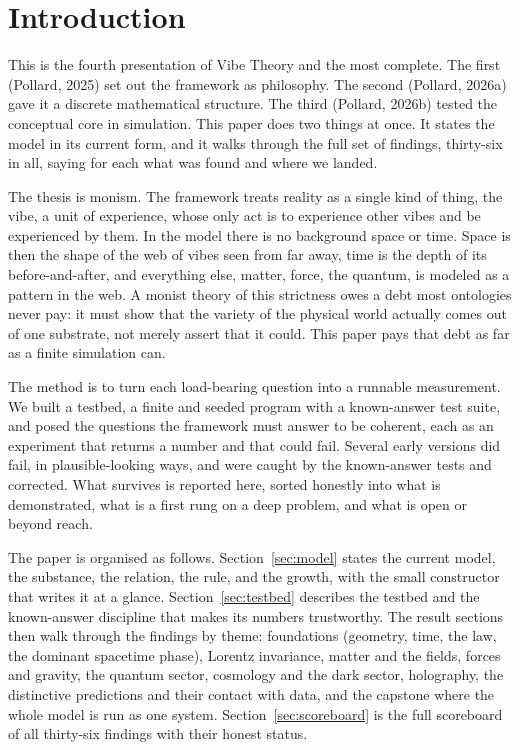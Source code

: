 \section{Introduction}
\label{sec:introduction}

This is the fourth presentation of Vibe Theory and the most complete. The first
(Pollard, 2025) set out the framework as philosophy. The second (Pollard, 2026a) gave
it a discrete mathematical structure. The third (Pollard, 2026b) tested the conceptual
core in simulation. This paper does two things at once. It states the model in its current form, and it walks through the
full set of findings, thirty-six in all, saying for each what was found and where we
landed.

The thesis is monism. The framework treats reality as a single kind of thing, the vibe,
a unit of experience, whose only act is to experience other vibes and be experienced by
them. In the model there is no background space or time. Space is then the shape of the
web of vibes seen from far away, time is the depth of its before-and-after, and
everything else, matter, force, the quantum, is modeled as a pattern in the web. A monist theory of this strictness owes a debt
most ontologies never pay: it must show that the variety of the physical world actually
comes out of one substrate, not merely assert that it could. This paper pays that debt
as far as a finite simulation can.

The method is to turn each load-bearing question into a runnable measurement. We built
a testbed, a finite and seeded program with a known-answer test suite, and posed the
questions the framework must answer to be coherent, each as an experiment that returns
a number and that could fail. Several early versions did fail, in plausible-looking
ways, and were caught by the known-answer tests and corrected. What survives is
reported here, sorted honestly into what is demonstrated, what is a first rung on a deep
problem, and what is open or beyond reach.

The paper is organised as follows. Section~\ref{sec:model} states the current model, the substance, the relation, the rule, and the growth, with the small constructor
that writes it at a glance. Section~\ref{sec:testbed} describes the testbed and the
known-answer discipline that makes its numbers trustworthy. The result sections then
walk through the findings by theme: foundations (geometry, time, the law, the dominant
spacetime phase), Lorentz invariance, matter and the fields, forces and gravity, the
quantum sector, cosmology and the dark sector, holography, the distinctive predictions
and their contact with data, and the capstone where the whole model is run as one
system. Section~\ref{sec:scoreboard} is the full scoreboard of all thirty-six findings
with their honest status.


